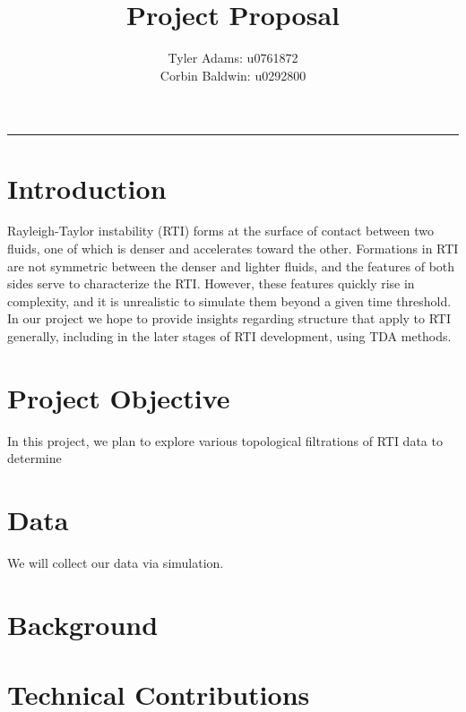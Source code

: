\documentclass[12pt, fullpage,letterpaper]{article}
\title{Project Proposal}
\author{Tyler Adams: u0761872 \\Corbin Baldwin: u0292800}
\begin{document}
	\maketitle 
	\hrule 
	\vskip 0.5cm
	\section*{\normalfont Introduction}

	Rayleigh-Taylor instability (RTI) forms at the surface of contact between two fluids, one of which is denser and accelerates toward the other. Formations in RTI are not symmetric between the denser and lighter fluids, and the features of both sides serve to characterize the RTI. However, these features quickly rise in complexity, and it is unrealistic to simulate them beyond a given time threshold. In our project we hope to provide insights regarding structure that apply to RTI generally, including in the later stages of RTI development, using TDA methods.
  
	\section*{\normalfont Project Objective}  
	In this project, we plan to explore various topological filtrations of RTI data to determine 
	
	\section*{\normalfont Data} 
	We will collect our data via simulation. 
	
	\section*{\normalfont Background} 
	  
	\section*{\normalfont Technical Contributions} 
	
\end{document}
